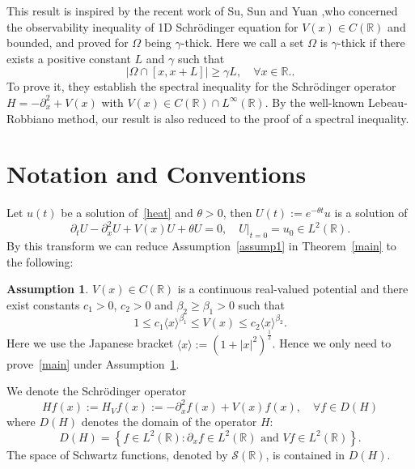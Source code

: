 \documentclass{amsart}
\newcommand\R{\ensuremath{\mathbb{R}}}
\theoremstyle{definition}
\newtheorem{assumption}[theorem]{Assumption}
\begin{document}
This result is inspired by the recent work of Su, Sun and Yuan \cite{su2023quantitative},who concerned the observability inequality of 1D Schrödinger equation for $V(x) \in  C(\R)$ and bounded, and proved for $\Omega$ being $\gamma$-thick. Here we call a set $\Omega$ is $\gamma$-thick if there exists a positive constant $L$ and $\gamma$ such that 
\begin{equation}
	|\Omega \cap [x,x+L]|\ge \gamma L,\quad \forall x\in \R.\label{gma-thick}.
\end{equation}
To prove it, they establish the spectral inequality for the Schrödinger operator $H=-\partial_x^2+V(x)$ with $V(x)\in C(\R)\cap L^{\infty}(\R)$. By the well-known Lebeau-Robbiano method, our result is also reduced to the proof of a spectral inequality.

\section{Notation and Conventions}


Let $u(t)$ be a solution of~\eqref{heat} and $\theta>0$, then $U(t):=e^{-\theta t}u$ is a solution of
\begin{equation}
	\partial_t U-\partial_x^2U+V(x)U+\theta U=0,\quad U\lvert_{t=0}=u_0 \in L^2(\R).
\end{equation}
By this transform we can reduce Assumption~\ref{assump1} in Theorem~\ref{main} to the following: 
\begin{assumption}\label{assump2}
	$V(x) \in C(\R)$ is a continuous real-valued potential and there exist constants $c_1> 0$, $c_2>0$ and $\beta_2\ge \beta_1>0$ such that
	\begin{equation}
		1\le c_1 \langle x\rangle ^{\beta_1}\le V(x)\le c_2 \langle x\rangle ^{\beta_2}. 
	\end{equation}
	Here we use the Japanese bracket $\langle x\rangle :=(1+|x|^2)^{\frac{1}{2}}$. Hence we only need to prove~\ref{main} under Assumption~\ref{assump2}.
\end{assumption}
We denote the Schrödinger operator
\begin{equation}
	Hf(x):=H_{V}f(x):=-\partial_x^2f(x)+V(x)f(x),\quad \forall f \in D(H) 
\end{equation}
where $D(H)$ denotes the domain of the operator $H$:
\begin{equation}
	D(H)=\left\{f\in L^2(\R): \partial_xf \in L^2(\R) \text{ and }Vf\in L^2(\R)\right\}. 
\end{equation}
The space of Schwartz functions, denoted by $\mathcal{S}(\R)$, is contained in $D(H)$.
\end{document}
